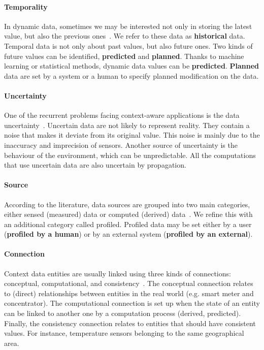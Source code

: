 \paragraph{Temporality}
In dynamic data, sometimes we may be interested not only in storing the latest value, but also the previous ones~\cite{DBLP:conf/seke/0001FNMKT14, DBLP:conf/pervasive/HenricksenIR02}. 
We refer to these data as \textbf{historical} data.
Temporal data is not only about past values, but also future ones. 
Two kinds of future values can be identified, \textbf{predicted} and \textbf{planned}.  
Thanks to machine learning or statistical methods, dynamic data values can be \textbf{predicted}. 
\textbf{Planned} data are set by a system or a human to specify planned modification on the data.

\paragraph{Uncertainty}
One of the recurrent problems facing context-aware applications is the data uncertainty~\cite{DBLP:conf/dagstuhl/LemosGMSALSTVVWBBBBCDDEGGGGIKKLMMMMMNPPSSSSTWW10, DBLP:conf/pervasive/HenricksenIR02, DBLP:journals/comsur/MakrisSS13, DBLP:journals/percom/BettiniBHINRR10}.
Uncertain data are not likely to represent reality. They contain a noise that makes it deviate from its original value.
This noise is mainly due to the inaccuracy and imprecision of sensors.
Another source of uncertainty is the behaviour of the environment, which can be unpredictable.
All the computations that use uncertain data are also uncertain by propagation.

\paragraph{Source}
According to the literature, data sources are grouped into two main categories, either sensed (measured) data or computed (derived) \linebreak data~\cite{DBLP:journals/comsur/PereraZCG14}.
We refine this with an additional category called profiled.
Profiled data may be set either by a user (\textbf{profiled by a human}) or by an external system (\textbf{profiled by an external}).

\paragraph{Connection}
Context data entities are usually linked using three kinds of connections: conceptual, computational, and consistency~\cite{DBLP:conf/pervasive/HenricksenIR02, DBLP:journals/percom/BettiniBHINRR10}.
The conceptual connection relates to  (direct) relationships between entities in the real world (e.g. smart meter and concentrator).
The computational connection is set up when the state of an entity can be linked to another one by a computation process (derived, predicted). 
Finally, the consistency connection relates to entities that should have consistent values. For instance, temperature sensors belonging to the same geographical area.


